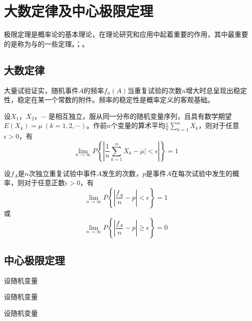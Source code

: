 \chapter{大数定律及中心极限定理}

极限定理是概率论的基本理论，在理论研究和应用中起着重要的作用，其中最重要的是称为与的一些定理。；。

\section{大数定律}

大量试验证实，随机事件$ A $的频率$ f_n(A) $当重复试验的次数$ n $增大时总呈现出稳定性，稳定在某一个常数的附件。频率的稳定性是概率定义的客观基础。

\begin{theorem}
	设$ X_1 $，$ X_2 $，$ \cdots $ 是相互独立，服从同一分布的随机变量序列，且具有数学期望$ E(X_k)=\mu \  (k=1,2,\cdots) $。作前$ n $个变量的算术平均$ \displaystyle \frac{1}{n}\sum_{k=1}^{n}X_{k} $，则对于任意$ \epsilon > 0 $，有
	\begin{equation}
		\lim_{n\to\infty}P\left\lbrace \left| \frac{1}{n}\sum_{k=1}^{n}X_{k} - \mu\rvert < \epsilon \right| \right\rbrace  = 1
	\end{equation}
\end{theorem}

\begin{theorem}[伯努利大数定理]
	设$ f_{A} $是$ n $次独立重复试验中事件$ A $发生的次数，$ p $是事件$ A $在每次试验中发生的概率，则对于任意正数$ \epsilon > 0 $，有
	\begin{equation}
		\lim_{n\to\infty}P\left\lbrace \left|\frac{f_A}{n}-p \right| < \epsilon \right\rbrace  = 1
	\end{equation}
	或
	\begin{equation}
		\lim_{n\to\infty}P\left\lbrace \left|\frac{f_A}{n}-p \right|\geqslant\epsilon \right\rbrace  = 0
	\end{equation}
\end{theorem}

\section{中心极限定理}

\begin{theorem}[独立同分布的中心极限定理]
	设随机变量
\end{theorem}

\begin{theorem}
	设随机变量
\end{theorem}

\begin{theorem}
	设随机变量
\end{theorem}